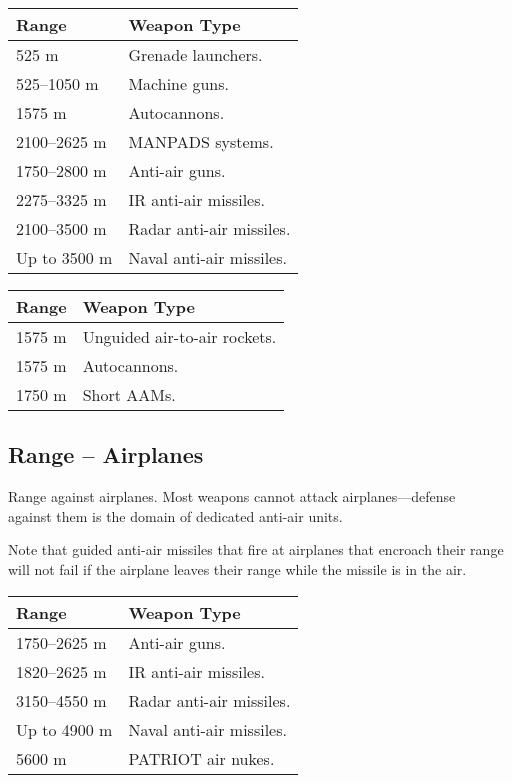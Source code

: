 \documentclass{article}
\begin{document}
\begin{center}
    \begin{tabular}{ | l | p{4cm} | }
    \hline
    Range & Weapon Type \\ \hline
    525 m & Grenade launchers.\\
    525--1050 m & Machine guns.\\
    1575 m & Autocannons. \\
    2100--2625 m & MANPADS systems. \\
    1750--2800 m & Anti-air guns. \\
    2275--3325 m & IR anti-air missiles. \\
    2100--3500 m & Radar anti-air missiles. \\
    Up to 3500 m & Naval anti-air missiles. \\
    \hline
    \end{tabular}
\end{center}

\begin{center}
    \begin{tabular}{ | l | p{5cm} | }
    \hline
    Range & Weapon Type \\ \hline
    1575 m & Unguided air-to-air rockets.\\
    1575 m & Autocannons.\\
    1750 m & Short AAMs.\\    
    \hline
    \end{tabular}
\end{center}

\subsection{Range -- Airplanes}

Range against airplanes. Most weapons cannot attack airplanes---defense\\
against them is the domain of dedicated anti-air units.

Note that guided anti-air missiles that fire at airplanes that encroach their
range will not fail if the airplane leaves their range while the missile is in
the air.

\begin{center}
    \begin{tabular}{ | l | p{4.5cm} | }
    \hline
    Range & Weapon Type \\ \hline
    1750--2625 m & Anti-air guns.\\
    1820--2625 m & IR anti-air missiles.\\
    3150--4550 m & Radar anti-air missiles. \\
    Up to 4900 m & Naval anti-air missiles. \\
    5600 m & PATRIOT air nukes. \\
    \hline
    \end{tabular}
\end{center}
\end{document}
